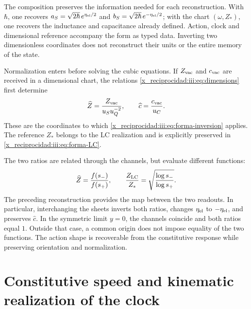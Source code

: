 The composition preserves the information needed for each reconstruction.
With $\hbar$, one recovers
$a_S=\sqrt{2\hbar}\,e^{\eta_{\rm el}/2}$ and
$b_S=\sqrt{2\hbar}\,e^{-\eta_{\rm el}/2}$; with the chart
$(\omega,Z_*)$, one recovers the inductance and capacitance already defined.
Action, clock and dimensional reference accompany the form as
typed data. Inverting two dimensionless coordinates does not
reconstruct their units or the entire memory of the state.

Normalization enters before solving the cubic equations.
If $Z_{\rm vac}$ and $c_{\rm vac}$ are received in a dimensional chart,
the relations \eqref{x_reciprocidad:iii:eq:dimensions} first determine
\[
 \widehat Z=\frac{Z_{\rm vac}}{u_Su_Q^{-2}},\qquad
 \widehat c=\frac{c_{\rm vac}}{u_C}.
\]
These are the coordinates to which
\eqref{x_reciprocidad:iii:eq:forma-inversion} applies. The reference $Z_*$ belongs to the
LC realization and is explicitly preserved in \eqref{x_reciprocidad:iii:eq:forma-LC}.

The two ratios are related through the channels, but evaluate
different functions:
\begin{equation}
 \widehat Z=\frac{f(s_-)}{f(s_+)},\qquad
 \frac{Z_{\rm LC}}{Z_*}
       =\sqrt{\frac{\log s_-}{\log s_+}}.
 \label{x_reciprocidad:iii:eq:forma-dos-cocientes}
\end{equation}
The preceding reconstruction provides the map between the two readouts.
In particular, interchanging the sheets inverts both ratios, changes
$\eta_{\rm el}$ to $-\eta_{\rm el}$, and preserves $\widehat c$.
In the symmetric limit $y=0$, the channels coincide and both ratios
equal $1$. Outside that case, a common origin does not impose equality
of the two functions. The action shape is recoverable from the
constitutive response while preserving orientation and normalization.



\section{Constitutive speed and kinematic realization of the clock}
\label{x_reciprocidad:iii:sec:enlace-velocidad-constitutiva}

